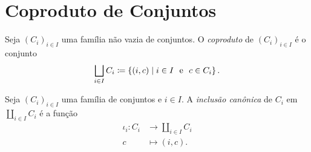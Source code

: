 




\section{Coproduto de Conjuntos}

\begin{defi}
Seja $(C_i)_{i \in I}$ uma família não vazia de conjuntos. O \emph{coproduto} de $(C_i)_{i \in I}$ é o conjunto
	\begin{equation*}
	\coprod_{i \in I} C_i \coloneqq\set{(i,c)}{i \in I \e c \in C_i}.
	\end{equation*}
\end{defi}

\begin{defi}
Seja $(C_i)_{i \in I}$ uma família de conjuntos e $i \in I$. A \emph{inclusão canônica} de $C_i$ em $\coprod_{i \in I} C_i$ é a função
	\begin{align*}
	\iota_i: C_i &\to \coprod_{i \in I} C_i \\
			c &\mapsto (i,c).
	\end{align*}
\end{defi}

